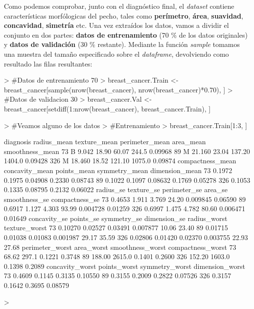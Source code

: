\documentclass [a4paper] {article}
\begin{document}
Como podemos comprobar, junto con el diagnóstico final, el \textit{dataset} contiene características morfólogicas del pecho, tales como \textbf{perímetro}, \textbf{área}, \textbf{suavidad}, \textbf{concavidad}, \textbf{simetría} etc.
Una vez extraídos los datos, vamos a dividir el conjunto en dos partes: \textbf{datos de entrenamiento} (70 \% de los datos originales) y \textbf{datos de validación} (30 \% restante). Mediante la función \textit{sample} tomamos una muestra del tamaño especificado sobre el \textit{dataframe}, devolviendo como resultado las filas resultantes:
\begin{Schunk}
\begin{Sinput}
> #Datos de entrenamiento 70%
> breast_cancer.Train <- breast_cancer[sample(nrow(breast_cancer), nrow(breast_cancer)*0.70), ]
> #Datos de validacion 30%
> breast_cancer.Val <- breast_cancer[setdiff(1:nrow(breast_cancer), breast_cancer.Train), ]
\end{Sinput}
\end{Schunk}
\begin{Schunk}
\begin{Sinput}
> #Veamos alguno de los datos
> #Entrenamiento
> breast_cancer.Train[1:3, ]
\end{Sinput}
\begin{Soutput}
    diagnosis radius_mean texture_mean perimeter_mean area_mean smoothness_mean
73          B       9.042        18.90          60.07     244.5         0.09968
89          M      21.160        23.04         137.20    1404.0         0.09428
326         M      18.460        18.52         121.10    1075.0         0.09874
    compactness_mean concavity_mean points_mean symmetry_mean dimension_mean
73            0.1972         0.1975     0.04908        0.2330        0.08743
89            0.1022         0.1097     0.08632        0.1769        0.05278
326           0.1053         0.1335     0.08795        0.2132        0.06022
    radius_se texture_se perimeter_se area_se smoothness_se compactness_se
73     0.4653      1.911        3.769   24.20      0.009845        0.06590
89     0.6917      1.127        4.303   93.99      0.004728        0.01259
326    0.6997      1.475        4.782   80.60      0.006471        0.01649
    concavity_se points_se symmetry_se dimension_se radius_worst texture_worst
73       0.10270   0.02527     0.03491     0.007877        10.06         23.40
89       0.01715   0.01038     0.01083     0.001987        29.17         35.59
326      0.02806   0.01420     0.02370     0.003755        22.93         27.68
    perimeter_worst area_worst smoothness_worst compactness_worst
73            68.62      297.1           0.1221            0.3748
89           188.00     2615.0           0.1401            0.2600
326          152.20     1603.0           0.1398            0.2089
    concavity_worst points_worst symmetry_worst dimension_worst
73           0.4609       0.1145         0.3135         0.10550
89           0.3155       0.2009         0.2822         0.07526
326          0.3157       0.1642         0.3695         0.08579
\end{Soutput}
\begin{Sinput}
> 
\end{Sinput}
\end{Schunk}
\end{document}

